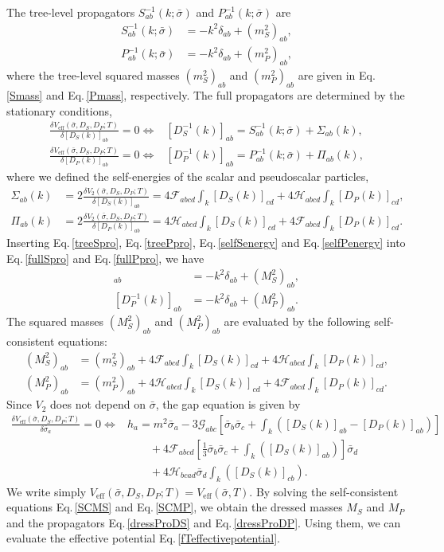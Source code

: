 \documentclass[a4paper,preprint,superscriptaddress,preprintnumbers,nofootinbib]{revtex4}
\newcommand{\al}[1]{\begin{align}#1\end{align}}
\newcommand{\nn}{\nonumber\\}
\newcommand{\fn}[1]{\!\left(#1\right)}
\begin{document}
\begin{appendix}
The tree-level propagators $S_{ab}^{-1}\fn{k;\bar \sigma}$ and $P_{ab}^{-1}\fn{k;\bar \sigma}$ are
\al{
S_{ab}^{-1}\fn{k;\bar \sigma}&=-k^2\delta_{ab} + (m_S^2)_{ab}
\label{treeSpro},\\
P_{ab}^{-1}\fn{k;\bar \sigma}&=-k^2\delta_{ab} + (m_P^2)_{ab},
\label{treePpro}
}
where the tree-level squared masses $(m_S^2)_{ab}$ and $(m_P^2)_{ab}$ are given in Eq.\,\eqref{Smass} and Eq.\,\eqref{Pmass}, respectively.
The full propagators are determined by the stationary conditions,
\al{
\frac{\delta V_\text{eff}\fn{\bar \sigma,D_S,D_P;T}}{\delta [D_S\fn{k}]_{ab}}=0\iff &
[D_S^{-1}\fn{k}]_{ab}= S_{ab}^{-1}\fn{k;\bar \sigma} +\Sigma_{ab}\fn{k},
\label{fullSpro}
\\
\frac{\delta V_\text{eff}\fn{\bar \sigma,D_S,D_P;T}}{\delta [D_P\fn{k}]_{ab}}=0\iff &
[D_P^{-1}\fn{k}]_{ab}= P_{ab}^{-1}\fn{k;\bar \sigma} +\Pi_{ab}\fn{k},
\label{fullPpro}
}
where we defined the self-energies of the scalar and pseudoscalar particles,
\al{
\Sigma_{ab}\fn{k}&=2\frac{\delta V_2\fn{\bar \sigma,D_S,D_P;T}}{\delta [D_S\fn{k}]_{ab}}
=4{\mathcal F}_{abcd}\int_k [D_S\fn{k}]_{cd} +4{\mathcal H}_{abcd}\int_k [D_P\fn{k}]_{cd} 
\label{selfSenergy}
,\\
\Pi_{ab}\fn{k}&=2\frac{\delta V_2\fn{\bar \sigma,D_S,D_P;T}}{\delta [D_P\fn{k}]_{ab}}
=4{\mathcal H}_{abcd}\int_k [D_S\fn{k}]_{cd} +4{\mathcal F}_{abcd}\int_k [D_P\fn{k}]_{cd}.
\label{selfPenergy}
}
Inserting Eq.\,\eqref{treeSpro}, Eq.\,\eqref{treePpro}, Eq.\,\eqref{selfSenergy} and Eq.\,\eqref{selfPenergy} into Eq.\,\eqref{fullSpro} and Eq.\,\eqref{fullPpro}, we have
\al{
[D_S^{-1}\fn{k}]_{ab}&= -k^2 \delta_{ab} +(M_S^2)_{ab},
\label{dressProDS}
\\
[D_P^{-1}\fn{k}]_{ab}&= -k^2 \delta_{ab} +(M_P^2)_{ab}.
\label{dressProDP}
}
The squared masses $(M_S^2)_{ab}$ and $(M_P^2)_{ab}$ are evaluated by the following self-consistent equations:
\al{
(M_S^2)_{ab}&=(m_S^2)_{ab}
+4{\mathcal F}_{abcd}\int_k[D_S\fn{k}]_{cd} 
+4{\mathcal H}_{abcd}\int_k[D_P\fn{k}]_{cd},
\label{SCMS}
\\
(M_P^2)_{ab}&=(m_P^2)_{ab}
+4{\mathcal H}_{abcd}\int_k[D_S\fn{k}]_{cd}
+4{\mathcal F}_{abcd}\int_k[D_P\fn{k}]_{cd}.
\label{SCMP}
}
Since $V_2$ does not depend on $\bar \sigma$, the gap equation is given by
\al{
\frac{\delta V_\text{eff}\fn{\bar \sigma,D_S,D_P;T}}{\delta {\bar \sigma}_a}=0\iff&
h_a=m^2{\bar \sigma}_a
-3{\mathcal G}_{abc}\left[ {\bar \sigma}_b{\bar \sigma}_c
+\int_k \left([D_S\fn{k}]_{ab} -[D_P\fn{k}]_{ab}  \right) \right]\nn
&\qquad + 4{\mathcal F}_{abcd}\left[ \frac{1}{3}{\bar \sigma}_b{\bar \sigma}_c
 + \int_k \left([D_S\fn{k}]_{ab}\right)\right]{\bar \sigma}_d\nn
&\qquad + 4{\mathcal H}_{bcad} {\bar \sigma}_d\int_k \left([D_S\fn{k}]_{cb}\right).
}
We write simply $V_\text{eff}\fn{\bar \sigma,D_S,D_P;T}=V_\text{eff}\fn{\bar \sigma,T}$.
By solving  the self-consistent equations Eq.\,\eqref{SCMS} and Eq.\,\eqref{SCMP}, we obtain the dressed masses $M_S$ and $M_P$ and the propagators Eq.\,\eqref{dressProDS} and Eq.\,\eqref{dressProDP}.
Using them, we can evaluate the effective potential Eq.\,\eqref{fTeffectivepotential}.


\end{appendix}
\end{document}
